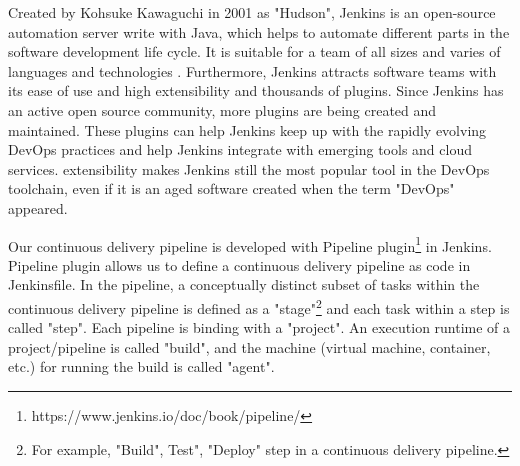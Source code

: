 \par
Created by Kohsuke Kawaguchi in 2001 as "Hudson", Jenkins is an open-source automation server write with Java, which helps to automate different parts in the software development life cycle.
It is suitable for a team of all sizes and varies of languages and technologies \cite{smart2011jenkins}. Furthermore, Jenkins attracts software teams with its ease of use and high extensibility \cite{smart2011jenkins} and thousands of plugins. Since Jenkins has an active open source community, more plugins are being created and maintained. These plugins can help Jenkins keep up with the rapidly evolving DevOps practices and help Jenkins integrate with emerging tools and cloud services. extensibility makes Jenkins still the most popular tool in the DevOps toolchain, even if it is an aged software created when the term "DevOps" appeared.
\par
Our continuous delivery pipeline is developed with Pipeline plugin\footnote{https://www.jenkins.io/doc/book/pipeline/} in Jenkins.
Pipeline plugin allows us to define a continuous delivery pipeline as code in Jenkinsfile.
In the pipeline, a conceptually distinct subset of tasks within the continuous delivery pipeline \cite{Pipeline85:online} is defined as a "stage"\footnote{For example, "Build", Test", "Deploy" step in a continuous delivery pipeline.} and each task within a step is called "step". Each pipeline is binding with a "project". An execution runtime of a project/pipeline is called "build", and the machine (virtual machine, container, etc.) for running the build is called "agent".
